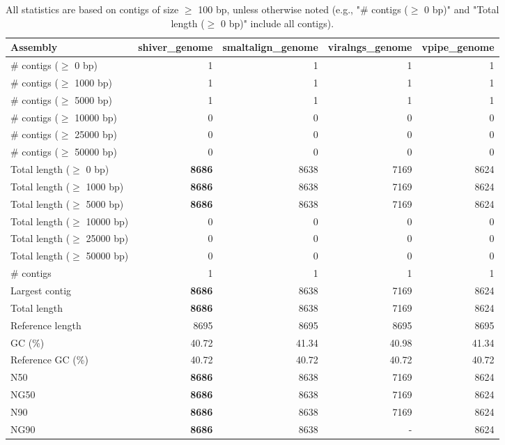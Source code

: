 \documentclass[12pt,a4paper]{article}
\begin{document}
\begin{table}[ht]
\begin{center}
\caption{All statistics are based on contigs of size $\geq$ 100 bp, unless otherwise noted (e.g., "\# contigs ($\geq$ 0 bp)" and "Total length ($\geq$ 0 bp)" include all contigs).}
\begin{tabular}{|l*{4}{|r}|}
\hline
Assembly & shiver\_genome & smaltalign\_genome & viralngs\_genome & vpipe\_genome \\ \hline
\# contigs ($\geq$ 0 bp) & 1 & 1 & 1 & 1 \\ \hline
\# contigs ($\geq$ 1000 bp) & 1 & 1 & 1 & 1 \\ \hline
\# contigs ($\geq$ 5000 bp) & 1 & 1 & 1 & 1 \\ \hline
\# contigs ($\geq$ 10000 bp) & 0 & 0 & 0 & 0 \\ \hline
\# contigs ($\geq$ 25000 bp) & 0 & 0 & 0 & 0 \\ \hline
\# contigs ($\geq$ 50000 bp) & 0 & 0 & 0 & 0 \\ \hline
Total length ($\geq$ 0 bp) & {\bf 8686} & 8638 & 7169 & 8624 \\ \hline
Total length ($\geq$ 1000 bp) & {\bf 8686} & 8638 & 7169 & 8624 \\ \hline
Total length ($\geq$ 5000 bp) & {\bf 8686} & 8638 & 7169 & 8624 \\ \hline
Total length ($\geq$ 10000 bp) & 0 & 0 & 0 & 0 \\ \hline
Total length ($\geq$ 25000 bp) & 0 & 0 & 0 & 0 \\ \hline
Total length ($\geq$ 50000 bp) & 0 & 0 & 0 & 0 \\ \hline
\# contigs & 1 & 1 & 1 & 1 \\ \hline
Largest contig & {\bf 8686} & 8638 & 7169 & 8624 \\ \hline
Total length & {\bf 8686} & 8638 & 7169 & 8624 \\ \hline
Reference length & 8695 & 8695 & 8695 & 8695 \\ \hline
GC (\%) & 40.72 & 41.34 & 40.98 & 41.34 \\ \hline
Reference GC (\%) & 40.72 & 40.72 & 40.72 & 40.72 \\ \hline
N50 & {\bf 8686} & 8638 & 7169 & 8624 \\ \hline
NG50 & {\bf 8686} & 8638 & 7169 & 8624 \\ \hline
N90 & {\bf 8686} & 8638 & 7169 & 8624 \\ \hline
NG90 & {\bf 8686} & 8638 & - & 8624 \\ \hline

\end{tabular}
\end{center}
\end{table}
\end{document}
